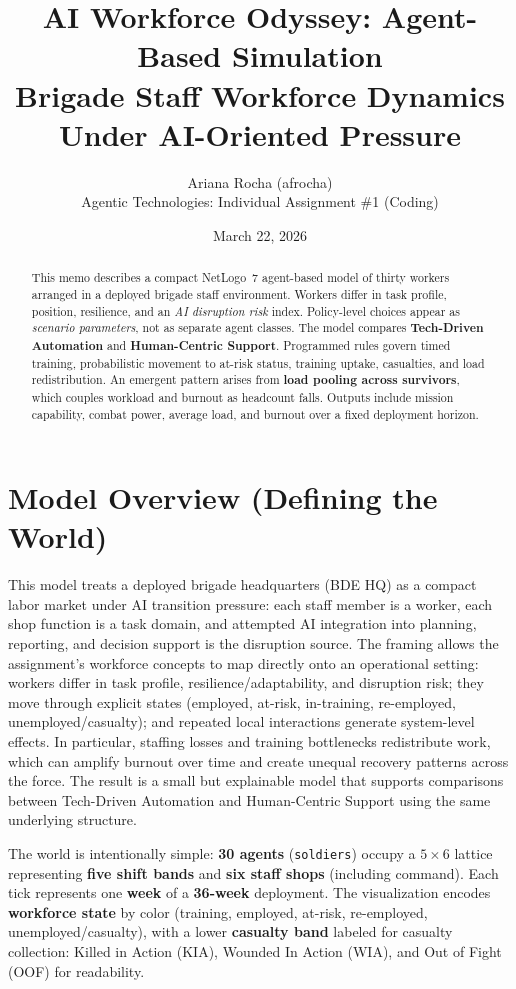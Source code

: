 \documentclass[11pt,letterpaper]{article}
\title{\textbf{AI Workforce Odyssey: Agent-Based Simulation}\\[0.35em]
\large Brigade Staff Workforce Dynamics Under AI-Oriented Pressure}
\author{Ariana Rocha (afrocha)\\
Agentic Technologies: Individual Assignment \#1 (Coding)}
\date{March 22, 2026}
\begin{document}
\maketitle

\begin{abstract}
This memo describes a compact NetLogo~7 agent-based model of thirty workers arranged in a deployed brigade staff environment. Workers differ in task profile, position, resilience, and an \emph{AI disruption risk} index. Policy-level choices appear as \emph{scenario parameters}, not as separate agent classes. The model compares \textbf{Tech-Driven Automation} and \textbf{Human-Centric Support}. Programmed rules govern timed training, probabilistic movement to at-risk status, training uptake, casualties, and load redistribution. An emergent pattern arises from \textbf{load pooling across survivors}, which couples workload and burnout as headcount falls. Outputs include mission capability, combat power, average load, and burnout over a fixed deployment horizon.
\end{abstract}

\section{Model Overview (Defining the World)}

This model treats a deployed brigade headquarters (BDE HQ) as a compact labor market under AI transition pressure: each staff member is a worker, each shop function is a task domain, and attempted AI integration into planning, reporting, and decision support is the disruption source. The framing allows the assignment’s workforce concepts to map directly onto an operational setting: workers differ in task profile, resilience/adaptability, and disruption risk; they move through explicit states (employed, at-risk, in-training, re-employed, unemployed/casualty); and repeated local interactions generate system-level effects. In particular, staffing losses and training bottlenecks redistribute work, which can amplify burnout over time and create unequal recovery patterns across the force. The result is a small but explainable model that supports comparisons between Tech-Driven Automation and Human-Centric Support using the same underlying structure.

The world is intentionally simple: \textbf{30 agents} (\texttt{soldiers}) occupy a \textbf{$5 \times 6$} lattice representing \textbf{five shift bands} and \textbf{six staff shops} (including command). Each tick represents one \textbf{week} of a \textbf{36-week} deployment. The visualization encodes \textbf{workforce state} by color (training, employed, at-risk, re-employed, unemployed/casualty), with a lower \textbf{casualty band} labeled for casualty collection: Killed in Action (KIA), Wounded In Action (WIA), and Out of Fight (OOF) for readability.
\end{document}
